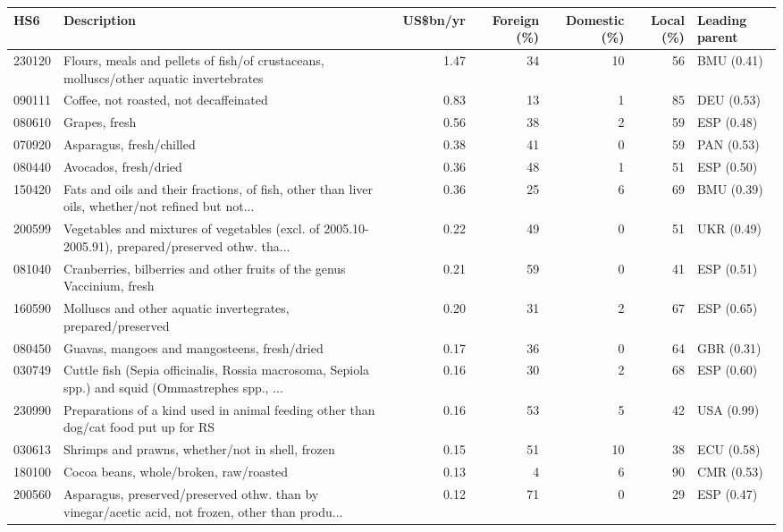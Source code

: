 \begin{tabular}{@{}l p{6.4cm} r r r r l@{}}
\toprule
HS6 & Description & US\$bn/yr & Foreign (\%) & Domestic (\%) & Local (\%) & Leading parent \\
\midrule
230120 & Flours, meals and pellets of fish/\allowbreak{}of crustaceans, molluscs/\allowbreak{}other aquatic invertebrates & 1.47 & 34 & 10 & 56 & BMU (0.41) \\
090111 & Coffee, not roasted, not decaffeinated & 0.83 & 13 & 1 & 85 & DEU (0.53) \\
080610 & Grapes, fresh & 0.56 & 38 & 2 & 59 & ESP (0.48) \\
070920 & Asparagus, fresh/\allowbreak{}chilled & 0.38 & 41 & 0 & 59 & PAN (0.53) \\
080440 & Avocados, fresh/\allowbreak{}dried & 0.36 & 48 & 1 & 51 & ESP (0.50) \\
150420 & Fats and oils and their fractions, of fish, other than liver oils, whether/\allowbreak{}not refined but not... & 0.36 & 25 & 6 & 69 & BMU (0.39) \\
200599 & Vegetables and mixtures of vegetables (excl. of 2005.10-2005.91), prepared/\allowbreak{}preserved othw. tha... & 0.22 & 49 & 0 & 51 & UKR (0.49) \\
081040 & Cranberries, bilberries and other fruits of the genus Vaccinium, fresh & 0.21 & 59 & 0 & 41 & ESP (0.51) \\
160590 & Molluscs and other aquatic invertegrates, prepared/\allowbreak{}preserved & 0.20 & 31 & 2 & 67 & ESP (0.65) \\
080450 & Guavas, mangoes and mangosteens, fresh/\allowbreak{}dried & 0.17 & 36 & 0 & 64 & GBR (0.31) \\
030749 & Cuttle fish (Sepia officinalis, Rossia macrosoma, Sepiola spp.) and squid (Ommastrephes spp., ... & 0.16 & 30 & 2 & 68 & ESP (0.60) \\
230990 & Preparations of a kind used in animal feeding other than dog/\allowbreak{}cat food put up for RS & 0.16 & 53 & 5 & 42 & USA (0.99) \\
030613 & Shrimps and prawns, whether/\allowbreak{}not in shell, frozen & 0.15 & 51 & 10 & 38 & ECU (0.58) \\
180100 & Cocoa beans, whole/\allowbreak{}broken, raw/\allowbreak{}roasted & 0.13 & 4 & 6 & 90 & CMR (0.53) \\
200560 & Asparagus, preserved/\allowbreak{}preserved othw. than by vinegar/\allowbreak{}acetic acid, not frozen, other than produ... & 0.12 & 71 & 0 & 29 & ESP (0.47) \\
\bottomrule
\end{tabular}

